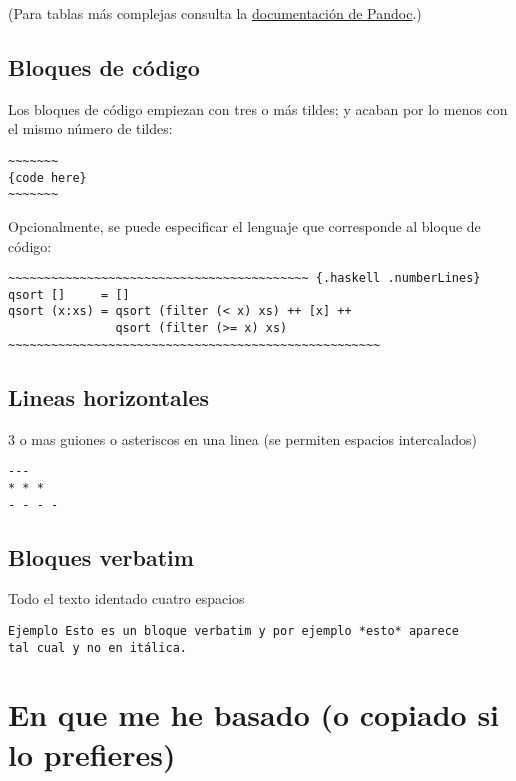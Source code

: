 \documentclass[12pt,spanish,]{article}
\begin{document}
(Para tablas más complejas consulta la
\href{http://pandoc.org/README.html\#tables}{documentación de Pandoc}.)

\subsection{Bloques de código}\label{bloques-de-cuxf3digo}

Los bloques de código empiezan con tres o más tildes; y acaban por lo
menos con el mismo número de tildes:

\begin{verbatim}
~~~~~~~
{code here}
~~~~~~~
\end{verbatim}

Opcionalmente, se puede especificar el lenguaje que corresponde al
bloque de código:

\begin{verbatim}
~~~~~~~~~~~~~~~~~~~~~~~~~~~~~~~~~~~~~~~~~~ {.haskell .numberLines}
qsort []     = []
qsort (x:xs) = qsort (filter (< x) xs) ++ [x] ++
               qsort (filter (>= x) xs)
~~~~~~~~~~~~~~~~~~~~~~~~~~~~~~~~~~~~~~~~~~~~~~~~~~~~
\end{verbatim}

\subsection{Lineas horizontales}\label{lineas-horizontales}

3 o mas guiones o asteriscos en una linea (se permiten espacios
intercalados)

\begin{verbatim}
---
* * *
- - - -
\end{verbatim}

\subsection{Bloques verbatim}\label{bloques-verbatim}

Todo el texto identado cuatro espacios

\begin{verbatim}
Ejemplo Esto es un bloque verbatim y por ejemplo *esto* aparece
tal cual y no en itálica.
\end{verbatim}

\section{En que me he basado (o copiado si lo
prefieres)}\label{en-que-me-he-basado-o-copiado-si-lo-prefieres}
\end{document}
